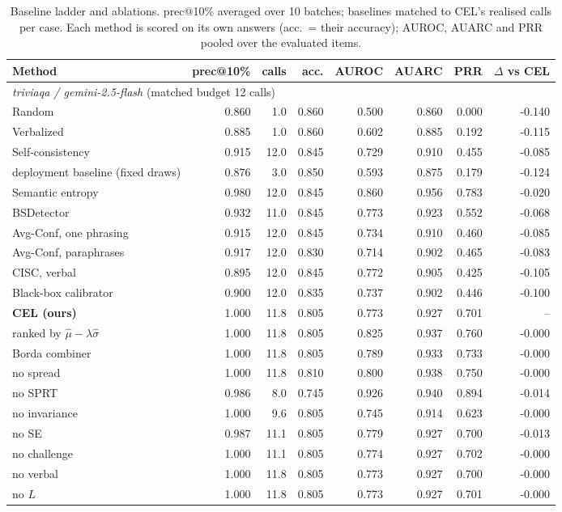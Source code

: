 \begin{table}[t]
\centering
\small
\begin{tabular}{lrrrrrrr}
\toprule
Method & prec@10\% & calls & acc. & AUROC & AUARC & PRR & $\Delta$ vs CEL \\
\midrule
\multicolumn{8}{l}{\emph{triviaqa / gemini-2.5-flash} (matched budget 12 calls)} \\
Random & 0.860 & 1.0 & 0.860 & 0.500 & 0.860 & 0.000 & -0.140 \\
Verbalized & 0.885 & 1.0 & 0.860 & 0.602 & 0.885 & 0.192 & -0.115 \\
Self-consistency & 0.915 & 12.0 & 0.845 & 0.729 & 0.910 & 0.455 & -0.085 \\
\quad deployment baseline (fixed draws) & 0.876 & 3.0 & 0.850 & 0.593 & 0.875 & 0.179 & -0.124 \\
Semantic entropy & 0.980 & 12.0 & 0.845 & 0.860 & 0.956 & 0.783 & -0.020 \\
BSDetector \citep{chen2024} & 0.932 & 11.0 & 0.845 & 0.773 & 0.923 & 0.552 & -0.068 \\
Avg-Conf, one phrasing \citep{xiong2023} & 0.915 & 12.0 & 0.845 & 0.734 & 0.910 & 0.460 & -0.085 \\
Avg-Conf, paraphrases \citep{xiong2023} & 0.917 & 12.0 & 0.830 & 0.714 & 0.902 & 0.465 & -0.083 \\
CISC, verbal \citep{taubenfeld2025} & 0.895 & 12.0 & 0.845 & 0.772 & 0.905 & 0.425 & -0.105 \\
Black-box calibrator \citep{pedapati2024} & 0.900 & 12.0 & 0.835 & 0.737 & 0.902 & 0.446 & -0.100 \\
\textbf{CEL (ours)} & 1.000 & 11.8 & 0.805 & 0.773 & 0.927 & 0.701 & -- \\
\quad ranked by $\hat\mu - \lambda\hat\sigma$ & 1.000 & 11.8 & 0.805 & 0.825 & 0.937 & 0.760 & -0.000 \\
\quad Borda combiner & 1.000 & 11.8 & 0.805 & 0.789 & 0.933 & 0.733 & -0.000 \\
\quad no spread & 1.000 & 11.8 & 0.810 & 0.800 & 0.938 & 0.750 & -0.000 \\
\quad no SPRT & 0.986 & 8.0 & 0.745 & 0.926 & 0.940 & 0.894 & -0.014 \\
\quad no invariance & 1.000 & 9.6 & 0.805 & 0.745 & 0.914 & 0.623 & -0.000 \\
\quad no SE & 0.987 & 11.1 & 0.805 & 0.779 & 0.927 & 0.700 & -0.013 \\
\quad no challenge & 1.000 & 11.1 & 0.805 & 0.774 & 0.927 & 0.702 & -0.000 \\
\quad no verbal & 1.000 & 11.8 & 0.805 & 0.773 & 0.927 & 0.700 & -0.000 \\
\quad no $L$ & 1.000 & 11.8 & 0.805 & 0.773 & 0.927 & 0.701 & -0.000 \\
\bottomrule
\end{tabular}
\caption{Baseline ladder and ablations. prec@10\% averaged over 10 batches; baselines matched to CEL's realised calls per case. Each method is scored on its own answers (acc.\ = their accuracy); AUROC, AUARC and PRR pooled over the evaluated items.}
\label{tab:main}
\end{table}
